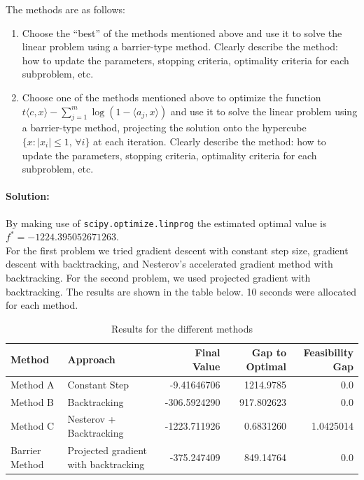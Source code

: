 \documentclass[10pt]{article}
\begin{document}
The methods are as follows:

\begin{enumerate}
  \item Choose the ``best'' of the methods mentioned above and use it to solve the linear problem using a barrier-type method. Clearly describe the method: how to update the parameters, stopping criteria, optimality criteria for each subproblem, etc.
  \item  Choose one of the methods mentioned above to optimize the function 
  $t \langle c, x \rangle - \sum_{j=1}^m \log(1 - \langle a_j, x \rangle)$
  and use it to solve the linear problem using a barrier-type method, projecting the solution onto the hypercube \( \{ x : |x_i| \leq 1, \, \forall i \} \) at each iteration. Clearly describe the method: how to update the parameters, stopping criteria, optimality criteria for each subproblem, etc.
  \end{enumerate}

\paragraph{Solution:}

By making use of \texttt{scipy.optimize.linprog} the estimated optimal value is $f^* = -1224.395052671263$.\\

For the first problem we tried gradient descent with constant step size, gradient descent with backtracking, and Nesterov's accelerated gradient method with backtracking. For the second problem, we used projected gradient with backtracking. The results are shown in the table below. 10 seconds were allocated for each method.\\

\begin{table}[h!]
  \centering
  \begin{tabular}{l l r r r}
  \hline
  \textbf{Method} & \textbf{Approach} & \textbf{Final Value} & \textbf{Gap to Optimal} & \textbf{Feasibility Gap} \\
  \hline
  Method A & Constant Step & -9.41646706 & 1214.9785 & 0.0 \\
  Method B & Backtracking & -306.5924290 & 917.802623 & 0.0 \\
  Method C & Nesterov + Backtracking & -1223.711926 & 0.6831260 & 1.0425014 \\
  Barrier Method & Projected gradient with backtracking & -375.247409 & 849.14764 & 0.0 \\
  \hline
  \end{tabular}
  \caption{Results for the different methods}
  \end{table}
\end{document}
